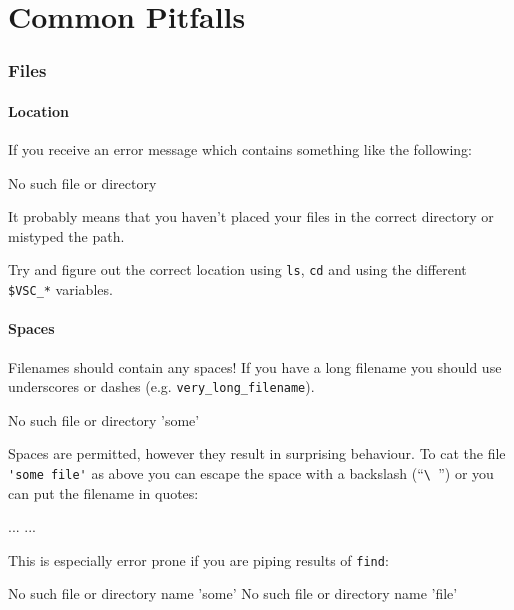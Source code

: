 \chapter{Common Pitfalls}

\subsection{Files}

\subsubsection{Location}
If you receive an error message which contains something like the following:

\begin{prompt}
No such file or directory
\end{prompt}

It probably means that you haven't placed your files in the correct directory or mistyped the path.

Try and figure out the correct location using \verb|ls|, \verb|cd| and using the
different \verb|$VSC_*| variables.

\subsubsection{Spaces}

Filenames should  contain any spaces! If you have a long filename
you should use underscores or dashes (e.g. \verb|very_long_filename|).

\begin{prompt}
No such file or directory 'some'
\end{prompt}

Spaces are permitted, however they result in surprising behaviour. To cat the
file \verb|'some file'| as above you can escape the space with a backslash (``\verb|\ |'')
or you can put the filename in quotes:

\begin{prompt}
...
...
\end{prompt}

This is especially error prone if you are piping results of \verb|find|:

\begin{prompt}
No such file or directory name 'some'
No such file or directory name 'file'
\end{prompt}

